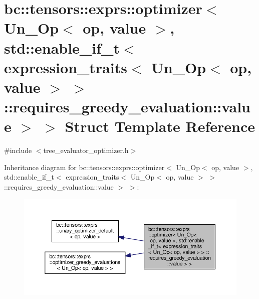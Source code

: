 \hypertarget{structbc_1_1tensors_1_1exprs_1_1optimizer_3_01Un__Op_3_01op_00_01value_01_4_00_01std_1_1enable__9d73ff143e1f6fbd1ef35f0907cdad0c}{}\section{bc\+:\+:tensors\+:\+:exprs\+:\+:optimizer$<$ Un\+\_\+\+Op$<$ op, value $>$, std\+:\+:enable\+\_\+if\+\_\+t$<$ expression\+\_\+traits$<$ Un\+\_\+\+Op$<$ op, value $>$ $>$ \+:\+:requires\+\_\+greedy\+\_\+evaluation\+:\+:value $>$ $>$ Struct Template Reference}
\label{structbc_1_1tensors_1_1exprs_1_1optimizer_3_01Un__Op_3_01op_00_01value_01_4_00_01std_1_1enable__9d73ff143e1f6fbd1ef35f0907cdad0c}


{\ttfamily \#include $<$tree\+\_\+evaluator\+\_\+optimizer.\+h$>$}



Inheritance diagram for bc\+:\+:tensors\+:\+:exprs\+:\+:optimizer$<$ Un\+\_\+\+Op$<$ op, value $>$, std\+:\+:enable\+\_\+if\+\_\+t$<$ expression\+\_\+traits$<$ Un\+\_\+\+Op$<$ op, value $>$ $>$ \+:\+:requires\+\_\+greedy\+\_\+evaluation\+:\+:value $>$ $>$\+:\nopagebreak
\begin{figure}[H]
\begin{center}
\leavevmode
\includegraphics[width=350pt]{structbc_1_1tensors_1_1exprs_1_1optimizer_3_01Un__Op_3_01op_00_01value_01_4_00_01std_1_1enable__a03a4794fbd7f89632ab1d70dd03eed7}
\end{center}
\end{figure}


